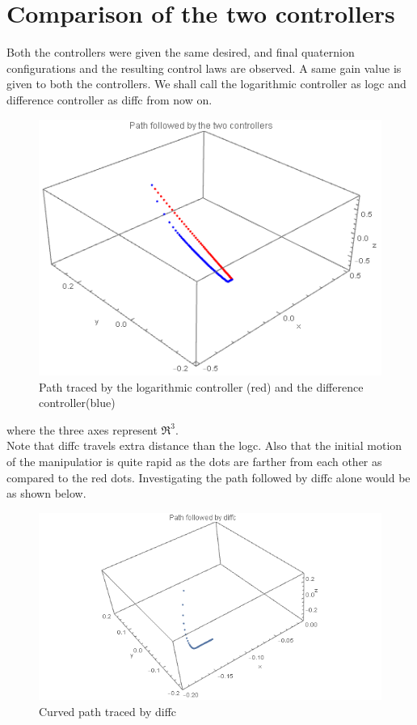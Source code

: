 \documentclass[a4paper,12pt]{article}
\begin{document}
\section{Comparison of the two controllers}
Both the controllers were given the same desired, and final quaternion configurations and the resulting control laws are observed. A same gain value is given to both the controllers. We shall call the logarithmic controller as logc and difference controller as diffc from now on.
\begin{figure}[H]
	\centering
	\includegraphics[scale=0.7]{dqc_comparison_path}
	\caption{Path traced by the logarithmic controller (red) and the difference controller(blue)}
	\label{fg:dqc_comparison}
\end{figure}
where the three axes represent $\Re^3$.\\
Note that diffc travels extra distance than the logc. Also that the initial motion of the manipulatior is quite rapid as the dots are farther from each other as compared to the red dots. Investigating the path followed by diffc alone would be as shown below. 
\begin{figure}[H]
	\centering
	\includegraphics[scale=0.8]{dqc_diffc_path}
	\caption{Curved path traced by diffc}
	\label{fg:dqc_diffc_path}
\end{figure}
\end{document}
